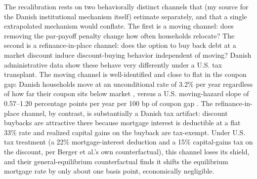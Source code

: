 \documentclass[12pt]{article}
\begin{document}
The recalibration rests on two behaviorally distinct channels that \citet{berger2026} (my source for the Danish institutional mechanism itself) estimate separately, and that a single extrapolated mechanism would conflate. The first is a moving channel: does removing the par-payoff penalty change how often households relocate? The second is a refinance-in-place channel: does the option to buy back debt at a market discount induce discount-buying behavior independent of moving? Danish administrative data show these behave very differently under a U.S. tax transplant. The moving channel is well-identified and close to flat in the coupon gap: Danish households move at an unconditional rate of 3.2\% per year regardless of how far their coupon sits below market \citep[\S4.6, structural parameters in tab.~3]{berger2026}, versus a U.S. moving-hazard slope of 0.57--1.20 percentage points per year per 100 bp of coupon gap \citep{fonseca2024}. The refinance-in-place channel, by contrast, is substantially a Danish tax artifact: discount buybacks are attractive there because mortgage interest is deductible at a flat 33\% rate and realized capital gains on the buyback are tax-exempt. Under U.S. tax treatment (a 22\% mortgage-interest deduction and a 15\% capital-gains tax on the discount, per Berger et al.'s own counterfactual), this channel loses its shield, and their general-equilibrium counterfactual \citep[\S4.9.1]{berger2026} finds it shifts the equilibrium mortgage rate by only about one basis point, economically negligible.
\end{document}
